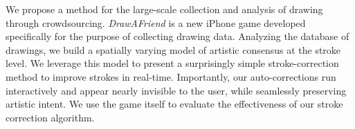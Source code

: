 
We propose a method for the large-scale collection and analysis of
drawing through crowdsourcing. {\em
DrawAFriend} is a new iPhone game developed specifically for the
purpose of collecting drawing data. Analyzing the database of
drawings, we build a spatially varying model of artistic consensus
at the stroke level. We leverage this model to present a
surprisingly simple stroke-correction method to improve strokes in
real-time. Importantly, our auto-corrections run interactively and
appear nearly invisible to the user, while seamlessly preserving
artistic intent. We use the game itself to evaluate the
effectiveness of our stroke correction algorithm.

